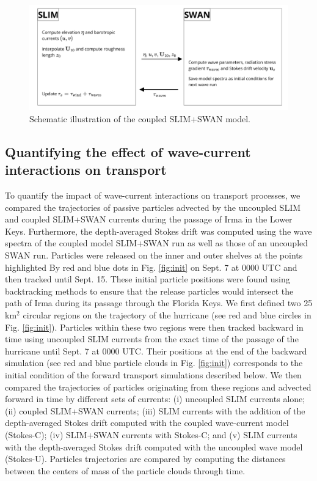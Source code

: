 \documentclass[preprint,12pt,authoryear]{elsarticle}
\begin{document}
\begin{figure}
    \centering
    \includegraphics[width=.99\textwidth]{fig/coupling_v2.png}
    \caption{Schematic illustration of the coupled SLIM+SWAN model.}
    \label{fig:coupling}
\end{figure}

\subsection{Quantifying the effect of wave-current interactions on transport}\label{sec:traj}

To quantify the impact of wave-current interactions on transport processes, we compared the trajectories of passive particles advected by the uncoupled SLIM and coupled SLIM+SWAN currents during the passage of Irma in the Lower Keys. Furthermore, the depth-averaged Stokes drift was computed using the wave spectra of the coupled model SLIM+SWAN run as well as those of an uncoupled SWAN run. Particles were released on the inner and outer shelves at the points highlighted By red and blue dots in Fig. \ref{fig:init} on Sept. 7 at 0000 UTC and then tracked until Sept. 15. These initial particle positions were found using backtracking methods \citep{dobbelaerereport} to ensure that the release particles would intersect the path of Irma during its passage through the Florida Keys. We first defined two 25 km$^\text{2}$ circular regions on the trajectory of the hurricane (see red and blue circles in Fig. \ref{fig:init}). Particles within these two regions were then tracked backward in time using uncoupled SLIM currents from the exact time of the passage of the hurricane until Sept. 7 at 0000 UTC. Their positions at the end of the backward simulation (see red and blue particle clouds in Fig. \ref{fig:init}) corresponds to the initial condition of the forward transport simulations described below. We then compared the trajectories of particles originating from these regions and advected forward in time by different sets of currents: (i) uncoupled SLIM currents alone; (ii) coupled SLIM+SWAN currents; (iii) SLIM currents with the addition of the depth-averaged Stokes drift computed with the coupled wave-current model (Stokes-C); (iv) SLIM+SWAN currents with Stokes-C; and (v) SLIM currents with the depth-averaged Stokes drift computed with the uncoupled wave model (Stokes-U). Particles trajectories are compared by computing the distances between the centers of mass of the particle clouds through time.
\end{document}
